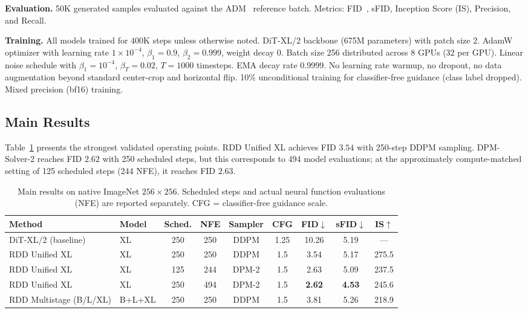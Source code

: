 \documentclass[10pt]{article}
\begin{document}
\textbf{Evaluation.} 50K generated samples evaluated against the ADM~\citep{dhariwal2021adm} reference batch.
Metrics: FID~\citep{heusel2017fid}, sFID, Inception Score (IS), Precision, and Recall.

\textbf{Training.} All models trained for 400K steps unless otherwise noted.
DiT-XL/2 backbone (675M parameters) with patch size 2.
AdamW optimizer with learning rate $1\times10^{-4}$, $\beta_1 = 0.9$, $\beta_2 = 0.999$, weight decay $0$.
Batch size 256 distributed across 8 GPUs (32 per GPU).
Linear noise schedule with $\beta_1 = 10^{-4}$, $\beta_T = 0.02$, $T = 1000$ timesteps.
EMA decay rate 0.9999.
No learning rate warmup, no dropout, no data augmentation beyond standard center-crop and horizontal flip.
10\% unconditional training for classifier-free guidance (class label dropped).
Mixed precision (bf16) training.

\subsection{Main Results}
\label{sec:main_results}

Table~\ref{tab:main_results} presents the strongest validated operating points.
RDD Unified XL achieves FID $3.54$ with 250-step DDPM sampling.
DPM-Solver-2 reaches FID $\mathbf{2.62}$ with 250 scheduled steps, but this corresponds to 494 model evaluations; at the approximately compute-matched setting of 125 scheduled steps (244 NFE), it reaches FID $2.63$.

\begin{table}[t]
\centering
\caption{Main results on native ImageNet $256\times256$. Scheduled steps and actual neural function evaluations (NFE) are reported separately. CFG = classifier-free guidance scale.}
\label{tab:main_results}
\begin{tabular}{@{}llccccccc@{}}
\toprule
\textbf{Method} & \textbf{Model} & \textbf{Sched.} & \textbf{NFE} & \textbf{Sampler} & \textbf{CFG} & \textbf{FID}$\downarrow$ & \textbf{sFID}$\downarrow$ & \textbf{IS}$\uparrow$ \\
\midrule
DiT-XL/2 (baseline) & XL & 250 & 250 & DDPM & 1.25 & 10.26 & 5.19 & --- \\
RDD Unified XL & XL & 250 & 250 & DDPM & 1.5 & 3.54 & 5.17 & 275.5 \\
RDD Unified XL & XL & 125 & 244 & DPM-2 & 1.5 & 2.63 & 5.09 & 237.5 \\
RDD Unified XL & XL & 250 & 494 & DPM-2 & 1.5 & \textbf{2.62} & \textbf{4.53} & 245.6 \\
RDD Multistage (B/L/XL) & B+L+XL & 250 & 250 & DDPM & 1.5 & 3.81 & 5.26 & 218.9 \\
\bottomrule
\end{tabular}
\end{table}
\end{document}
